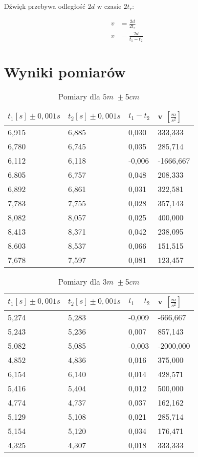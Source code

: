 \documentclass[a4paper,12pt]{article}
\begin{document}
Dźwięk przebywa odległość $2d$ w czasie $2 t_r$:

\begin{align*}
    v &= \frac{2d}{2 t_r}\\
    v &= \frac{2d}{t_1 - t_2}
\end{align*}

\clearpage

\section{Wyniki pomiarów}

\begin{table}[h]
	\begin{tabular}{|l|l|l|l|}
		\hline
		$t_1 [s] \pm 0,001 s$	& $t_2 [s] \pm 0,001 s$ & $t_1 - t_2$ & v $\left[\frac{m}{s^2}\right]$ \\\hline\hline
6,915	& 6,885	& 0,030	& 333,333 	\\\hline
6,780	& 6,745	& 0,035	& 285,714 	\\\hline
6,112	& 6,118	& -0,006	& -1666,667 	\\\hline
6,805	& 6,757	& 0,048	& 208,333 	\\\hline
6,892	& 6,861	& 0,031	& 322,581 	\\\hline
7,783	& 7,755	& 0,028	& 357,143 	\\\hline
8,082	& 8,057	& 0,025	& 400,000 	\\\hline
8,413	& 8,371	& 0,042	& 238,095 	\\\hline
8,603	& 8,537	& 0,066	& 151,515 	\\\hline
7,678	& 7,597	& 0,081	& 123,457 	\\\hline
	\end{tabular}
	\centering
	\caption{Pomiary dla $5m\; \pm 5cm$}
\end{table}

\begin{table}[h]
	\begin{tabular}{|l|l|l|l|}
		\hline
		$t_1 [s] \pm 0,001 s$	& $t_2 [s] \pm 0,001 s$ & $t_1 - t_2$ & v $\left[\frac{m}{s^2}\right]$ \\\hline\hline
5,274	& 5,283	& -0,009	& -666,667 	\\\hline
5,243	& 5,236	& 0,007	& 857,143 	\\\hline
5,082	& 5,085	& -0,003	& -2000,000 	\\\hline
4,852	& 4,836	& 0,016	& 375,000 	\\\hline
6,154	& 6,140	& 0,014	& 428,571 	\\\hline
5,416	& 5,404	& 0,012	& 500,000 	\\\hline
4,774	& 4,737	& 0,037	& 162,162 	\\\hline
5,129	& 5,108	& 0,021	& 285,714 	\\\hline
5,154	& 5,120	& 0,034	& 176,471 	\\\hline
4,325	& 4,307	& 0,018	& 333,333 	\\\hline
	\end{tabular}
	\centering
	\caption{Pomiary dla $3m\; \pm 5cm$}
\end{table}
\end{document}

